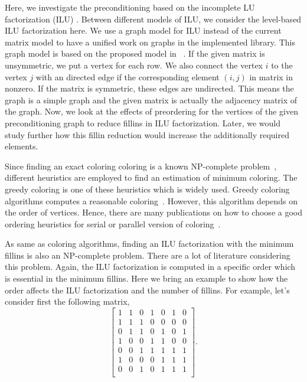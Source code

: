 \documentclass[12pt, oneside]{book}
\begin{document}
Here, we investigate the preconditioning based on the incomplete LU factorization (ILU) \cite{ilu2003}.
Between different models of ILU, we consider the level-based ILU factorization here.
We use a graph model for ILU instead of the current matrix model to have a unified
work on graphs in the implemented library. This graph model is based on the proposed
model in ~\cite{precond-pothen}. If the given matrix is unsymmetric,
we put a vertex for each row. We also connect the vertex $i$ to the
vertex $j$ with an directed edge if the corresponding element $(i,j)$ in matrix
in nonzero. If the matrix is symmetric, these edges are undirected. This means
 the graph is a simple graph and the given matrix is actually the adjacency
matrix of the graph.
Now, we look at the effects of preordering for the vertices of the given preconditioning graph to reduce fillins in ILU factorization. Later, we would study further how this fillin reduction would increase the additionally required elements.

Since finding an exact coloring coloring is a known NP-complete problem~\cite{SPINRAD198589},
different heuristics are employed to find an estimation of minimum coloring. The greedy
coloring is one of these heuristics which is widely used. 
Greedy coloring algorithms computes a reasonable coloring~\cite{spaa14}.
However, this algorithm depends on the order of vertices. 
Hence, there are many publications on how to choose a good ordering heuristics
for serial or parallel version of coloring~\cite{ordering1,ordering2,ordering3}.

As same as coloring algorithms, finding an ILU factorization with the minimum
fillins is also an NP-complete problem. There are a lot of literature 
considering this problem\cite{ilu_ordering1,ilu_ordering2,ilu_ordering3,ilu_ordering4}. 
Again, the ILU factorization is computed in a specific order which is essential
in the minimum fillins. Here we bring an example to show how the order affects 
the ILU factorization and the number of fillins. 
For example, let's consider first the following matrix,
$$\begin{bmatrix}
 1 & 1 & 0 & 1 & 0 & 1 & 0\\
 1 & 1 & 1 & 0 & 0 & 0 & 0\\
 0 & 1 & 1 & 0 & 1 & 0 & 1\\
 1 & 0 & 0 & 1 & 1 & 0 & 0\\
 0 & 0 & 1 & 1 & 1 & 1 & 1\\
 1 & 0 & 0 & 0 & 1 & 1 & 1\\
 0 & 0 & 1 & 0 & 1 & 1 & 1\\
 \end{bmatrix}.$$
\end{document}
